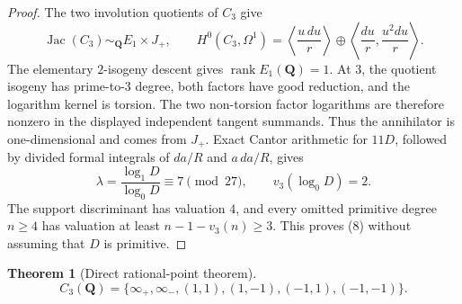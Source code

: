 \documentclass[11pt]{article}
\newtheorem{theorem}{Theorem}
\newcommand{\Q}{\mathbf Q}
\begin{document}
\begin{proof}
The two involution quotients of $C_3$ give
\[
 \operatorname{Jac}(C_3)\sim_\Q E_1\times J_+,\qquad
 H^0(C_3,\Omega^1)=
 \left\langle\frac{u\,du}{r}\right\rangle\oplus
 \left\langle\frac{du}{r},\frac{u^2du}{r}\right\rangle.
\]
The elementary $2$-isogeny descent gives
\(\operatorname{rank}E_1(\Q)=1\).  At \(3\), the quotient isogeny has
prime-to-\(3\) degree, both factors have good reduction, and the logarithm
kernel is torsion.  The two non-torsion factor logarithms are therefore
nonzero in the displayed independent tangent summands.  Thus the annihilator
is one-dimensional and comes from $J_+$.  Exact Cantor arithmetic for $11D$,
followed by
divided formal integrals of $da/R$ and $a\,da/R$, gives
\[
 \lambda=\frac{\log_1D}{\log_0D}\equiv7\pmod {27},
 \qquad v_3(\log_0D)=2.
\]
The support discriminant has valuation $4$, and every omitted primitive
degree $n\ge4$ has valuation at least
$n-1-v_3(n)\ge3$.  This proves (8) without assuming that $D$ is primitive.
\end{proof}

\begin{theorem}[Direct rational-point theorem]\label{thm:c3}
\[
 C_3(\Q)=
 \{\infty_+,\infty_-,(1,1),(1,-1),(-1,1),(-1,-1)\}. \tag{9}
\]
\end{theorem}
\end{document}

